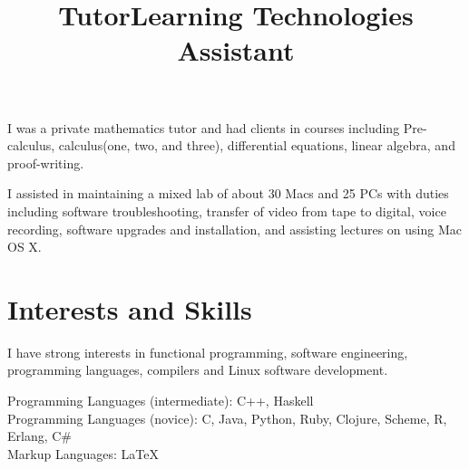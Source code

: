 \documentclass[margintitle,line]{res}
\renewcommand{\subsection}[1]{\section{\normalfont #1}}
\begin{document}
\begin{resume}
\title{Tutor}
\begin{position}
I was a private mathematics tutor and had clients in courses including Pre-calculus, calculus(one, two, and three), differential equations, linear algebra, and proof-writing.
\end{position}

\title{Learning Technologies Assistant}
\begin{position}
 I assisted in maintaining a mixed lab of about 30 Macs and 25 PCs with duties including software troubleshooting, transfer of video from tape to digital, voice recording, software upgrades and installation, and assisting lectures on using Mac OS X.
\end{position}





\setlength{\parskip}{1ex}





\section{Interests and Skills}

I have strong interests in functional programming, software engineering, programming languages, compilers and Linux software development. 

Programming Languages (intermediate): C++, Haskell \\
Programming Languages (novice): C, Java, Python, Ruby, Clojure, Scheme, R, Erlang, C\# \\
Markup Languages: LaTeX \\


\end{resume}
\end{document}
